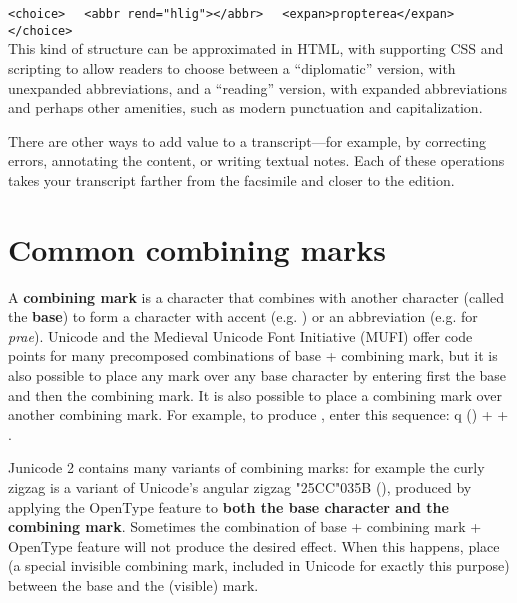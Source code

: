 \noindent\verb!<choice>!\newline
\verb!  <abbr rend="hlig">!\textrm{}\verb!</abbr>!\newline
\verb!  <expan>propterea</expan>!\newline
\verb!</choice>!\\[1ex]

\noindent This kind of structure can be approximated in HTML, with supporting CSS and scripting to allow readers to choose between
a ``diplomatic'' version, with unexpanded abbreviations, and a ``reading'' version, with expanded abbreviations and
perhaps other amenities, such as modern punctuation and capitalization.

There are other ways to add value to a transcript---for example, by correcting errors, annotating the content, or
writing textual notes. Each of these operations takes your transcript farther from the facsimile and closer to the
edition.

\section[Common combining marks]{Common combining marks}
A \textbf{combining mark} is a character that combines with another character (called the \textbf{base}) to form a
character with accent (e.g. ) or an abbreviation (e.g.  for \textit{prae}).
Unicode and the Medieval Unicode Font Initiative (MUFI) offer code points for many precomposed combinations of base +
combining mark, but it is also possible to place any mark over any base character by entering first the base and then
the combining mark. It is also possible to place a combining mark over another combining mark. For example, to produce
, enter this sequence: q () +  + .

Junicode 2 contains many variants of combining marks: for example the curly zigzag  is a variant of
Unicode's angular zigzag {\char"25CC\char"035B} (), produced by applying the OpenType feature 
 to
\textbf{both the base character and the combining mark}. Sometimes the combination of base + combining mark + OpenType
feature will not produce the desired effect. When this happens, place  (a special invisible combining mark,
included in Unicode for exactly this purpose) between the base and the (visible) mark.\\

